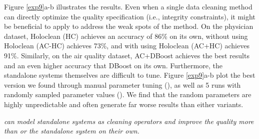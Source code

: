 Figure \ref{exp9}a-b illustrates the results.
Even when a single data cleaning method can directly optimize the quality specification (i.e., integrity constraints), it might be beneficial to apply \sys to address the weak spots of the method. On the physician dataset, Holoclean (HC) achieves an accuracy of 86\% on its own, \sys without using Holoclean (AC-HC) achieves 73\%, and with using Holoclean (AC+HC) achieves 91\%. Similarly, on the air quality dataset, AC+DBoost achieves the best results and an even higher accuracy that DBoost on its own.
Furthermore, the standalone systems themselves are difficult to tune. 
Figure \ref{exp9}a-b plot the best version we found through manual parameter tuning (), as well as 5 runs with randomly sampled parameter values ().  We find that the random parameters are highly unpredictable and often generate far worse results than either \sys variants.

{\it {} \sys can model standalone systems as cleaning operators and improve the quality more than \sys or the standalone system on their own.   }

